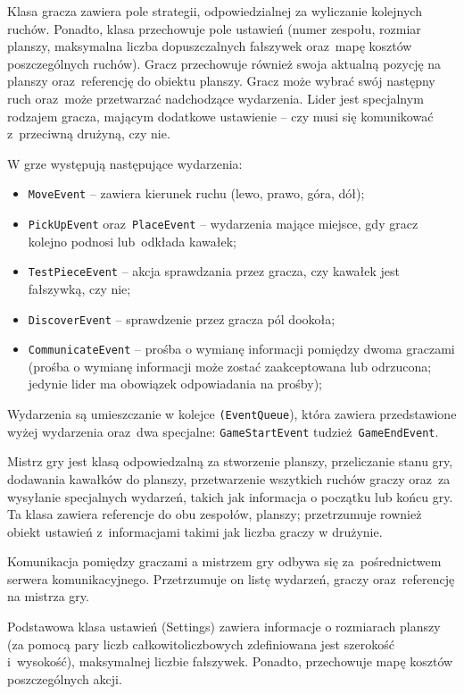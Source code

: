 \documentclass[a4paper]{article}
\newcommand{\code}{\texttt}
\begin{document}
Klasa gracza zawiera pole strategii, odpowiedzialnej za wyliczanie kolejnych ruchów.
Ponadto, klasa przechowuje pole ustawień (numer zespołu, rozmiar planszy, maksymalna liczba dopuszczalnych fałszywek oraz~mapę kosztów poszczególnych ruchów).
Gracz przechowuje również swoja aktualną pozycję na planszy oraz~referencję do obiektu planszy.
Gracz może wybrać swój następny ruch oraz~może przetwarzać nadchodzące wydarzenia.
Lider jest specjalnym rodzajem gracza, mającym dodatkowe ustawienie -- czy musi się komunikować z~przeciwną drużyną, czy nie.

\hfill 

W grze występują następujące wydarzenia:
\begin{itemize}
    \item \code{MoveEvent} -- zawiera kierunek ruchu (lewo, prawo, góra, dół);
    \item \code{PickUpEvent} oraz~\code{PlaceEvent} -- wydarzenia mające miejsce, gdy gracz kolejno podnosi lub~odkłada kawałek;
    \item \code{TestPieceEvent} -- akcja sprawdzania przez gracza, czy kawałek jest fałszywką, czy nie;
    \item \code{DiscoverEvent} -- sprawdzenie przez gracza pól dookoła;
    \item \code{CommunicateEvent} -- prośba o wymianę informacji pomiędzy dwoma graczami (prośba o wymianę informacji może zostać zaakceptowana lub odrzucona; jedynie lider ma obowiązek odpowiadania na prośby);
\end{itemize}

Wydarzenia są umieszczanie w kolejce \code{(EventQueue}), która zawiera przedstawione wyżej wydarzenia oraz~dwa specjalne: \code{GameStartEvent} tudzież~\code{GameEndEvent}.

\hfill

Mistrz gry jest klasą odpowiedzalną za stworzenie planszy, przeliczanie stanu gry, dodawania kawałków do planszy, przetwarzenie wszytkich ruchów graczy oraz~za wysyłanie specjalnych wydarzeń, takich jak informacja o początku lub końcu gry.
Ta klasa zawiera referencje do obu zespołów, planszy; przetrzumuje rownież obiekt ustawień z~informacjami takimi jak liczba graczy w drużynie.

Komunikacja pomiędzy graczami a mistrzem gry odbywa się za~pośrednictwem serwera komunikacyjnego.
Przetrzumuje on listę wydarzeń, graczy oraz~referencję na mistrza gry.

Podstawowa klasa ustawień (Settings) zawiera informacje o rozmiarach planszy (za pomocą pary liczb całkowitoliczbowych zdefiniowana jest szerokość i~wysokość), maksymalnej liczbie fałszywek.
Ponadto, przechowuje mapę kosztów poszczególnych akcji.
\end{document}
